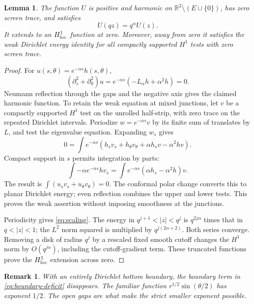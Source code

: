 \documentclass[11pt]{article}
\newtheorem{lemma}[theorem]{Lemma}
\newtheorem{remark}[theorem]{Remark}
\newcommand{\R}{\mathbb R}
\begin{document}
\begin{lemma}\label{lem:harmonic}
The function \(U\) is positive and harmonic on \(\R^2\setminus(E\cup\{0\})\),
has zero screen trace, and satisfies
\begin{equation}\label{eq:scaling}
 U(qz)=q^\alpha U(z).
\end{equation}
It extends to an \(H^1_{\rm loc}\) function at zero. Moreover, away from
zero it satisfies the weak Dirichlet energy identity for all compactly
supported \(H^1\) tests with zero screen trace.
\end{lemma}
\begin{proof}
For \(u(s,\theta)=e^{-\alpha s}h(s,\theta)\),
\[
 (\partial_s^2+\partial_\theta^2)u
     =e^{-\alpha s}(-L_\alpha h+\alpha^2h)=0 .
\]
Neumann reflection through the gaps and the negative axis gives the
claimed harmonic function. To retain the weak equation at mixed junctions,
let \(v\) be a compactly supported \(H^1\) test on the unrolled half-strip,
with zero trace on the repeated Dirichlet intervals. Periodize
\(w=e^{-\alpha s}v\) by its finite sum of translates by \(L\), and test the
eigenvalue equation. Expanding \(w_s\) gives
\[
 0=\int e^{-\alpha s}
   (h_s v_s+h_\theta v_\theta+\alpha h_s v-\alpha^2h v).
\]
Compact support in \(s\) permits integration by parts:
\[
 \int-\alpha e^{-\alpha s}h v_s
       =\int e^{-\alpha s}(\alpha h_s-\alpha^2h)v .
\]
The result is \(\int(u_sv_s+u_\theta v_\theta)=0\).
The conformal polar change converts this to planar Dirichlet energy;
even reflection combines the upper and lower tests. This proves the weak
assertion without imposing smoothness at the junctions.

Periodicity gives \eqref{eq:scaling}. The energy in
\(q^{j+1}<|z|<q^j\) is \(q^{2j\alpha}\) times that in \(q<|z|<1\);
the \(L^2\) norm squared is multiplied by \(q^{j(2\alpha+2)}\).
Both series converge. Removing a disk of radius \(q^j\) by a rescaled
fixed smooth cutoff changes the \(H^1\) norm by \(O(q^{j\alpha})\),
including the cutoff-gradient term. These truncated functions prove the
\(H^1_{\rm loc}\) extension across zero.
\end{proof}

\begin{remark}
With an entirely Dirichlet bottom boundary, the boundary term in
\eqref{eq:boundary-deficit} disappears. The familiar function
\(r^{1/2}\sin(\theta/2)\) has exponent \(1/2\).
The open gaps are what make the strict smaller exponent possible.
\end{remark}
\end{document}
